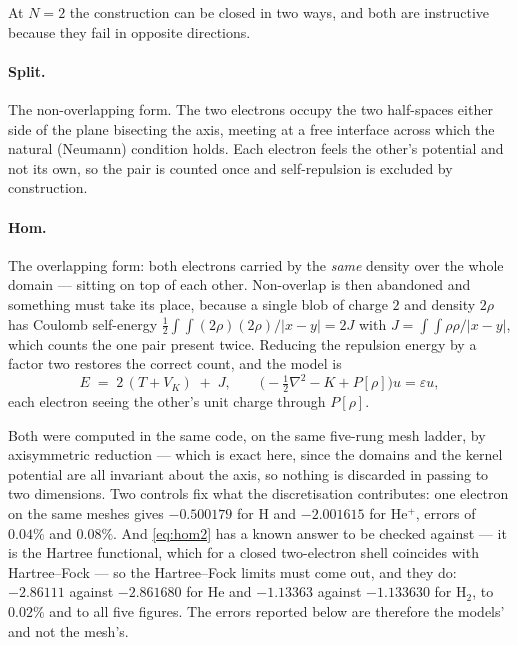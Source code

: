\documentclass[11pt]{article}
\begin{document}
At $N=2$ the construction can be closed in two ways, and both are instructive because they fail in
opposite directions.

\paragraph{Split.} The non-overlapping form. The two electrons occupy the two half-spaces either
side of the plane bisecting the axis, meeting at a free interface across which the natural
(Neumann) condition holds. Each electron feels the other's potential and not its own, so the pair
is counted once and self-repulsion is excluded by construction.

\paragraph{Hom.} The overlapping form: both electrons carried by the \emph{same} density over the
whole domain --- sitting on top of each other. Non-overlap is then abandoned and something must
take its place, because a single blob of charge $2$ and density $2\rho$ has Coulomb self-energy
$\tfrac12\!\int\!\!\int (2\rho)(2\rho)/|x-y| = 2J$ with $J = \int\!\!\int \rho\rho/|x-y|$, which
counts the one pair present twice. Reducing the repulsion energy by a factor two restores the
correct count, and the model is
\begin{equation}
E \;=\; 2\,(T + V_K) \;+\; J , \qquad
\bigl(-\tfrac12\nabla^2 - K + P[\rho]\bigr)u = \varepsilon u ,
\label{eq:hom2}
\end{equation}
each electron seeing the other's unit charge through $P[\rho]$.

Both were computed in the same code, on the same five-rung mesh ladder, by axisymmetric reduction
--- which is exact here, since the domains and the kernel potential are all invariant about the
axis, so nothing is discarded in passing to two dimensions. Two controls fix what the
discretisation contributes: one electron on the same meshes gives $-0.500179$ for H and
$-2.001615$ for He$^+$, errors of $0.04\%$ and $0.08\%$. And \eqref{eq:hom2} has a known answer to
be checked against --- it is the Hartree functional, which for a closed two-electron shell
coincides with Hartree--Fock --- so the Hartree--Fock limits must come out, and they do:
$-2.86111$ against $-2.861680$ for He and $-1.13363$ against $-1.133630$ for H$_2$, to $0.02\%$
and to all five figures. The errors reported below are therefore the models' and not the mesh's.
\end{document}
